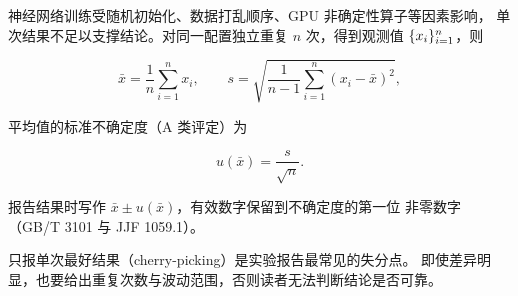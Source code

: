 神经网络训练受随机初始化、数据打乱顺序、GPU 非确定性算子等因素影响，
单次结果不足以支撑结论。对同一配置独立重复 $n$ 次，得到观测值
$\{x_i\}_{i=1}^{n}$，则

\begin{equation}
  \label{eq:mean-std}
  \bar{x} = \frac{1}{n}\sum_{i=1}^{n} x_i, \qquad
  s = \sqrt{\frac{1}{n-1}\sum_{i=1}^{n}\left(x_i - \bar{x}\right)^2},
\end{equation}

平均值的标准不确定度（A 类评定）为

\begin{equation}
  \label{eq:uncertainty}
  u(\bar{x}) = \frac{s}{\sqrt{n}}.
\end{equation}

报告结果时写作 $\bar{x} \pm u(\bar{x})$，有效数字保留到不确定度的第一位
非零数字（GB/T 3101 与 JJF 1059.1）。

\begin{caution}
  只报单次最好结果（cherry-picking）是实验报告最常见的失分点。
  即使差异明显，也要给出重复次数与波动范围，否则读者无法判断结论是否可靠。
\end{caution}
